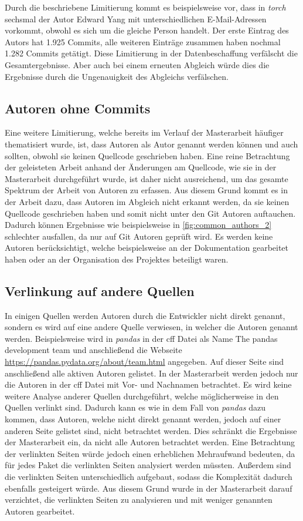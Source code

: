 Durch die beschriebene Limitierung kommt es beispielsweise vor, dass in \emph{torch} sechsmal der Autor \glqq Edward Yang\grqq{} mit unterschiedlichen E-Mail-Adressen vorkommt, obwohl es sich um die gleiche Person handelt.
Der erste Eintrag des Autors hat 1.925 Commits, alle weiteren Einträge zusammen haben nochmal 1.282 Commits getätigt.
Diese Limitierung in der Datenbeschaffung verfälscht die Gesamtergebnisse.
Aber auch bei einem erneuten Abgleich würde dies die Ergebnisse durch die Ungenauigkeit des Abgleichs verfälschen.

\subsection*{Autoren ohne Commits}
\label{sec:autoren_ohne_commits}
Eine weitere Limitierung, welche bereits im Verlauf der Masterarbeit häufiger thematisiert wurde, ist, dass Autoren als Autor genannt werden können und auch sollten, obwohl sie keinen Quellcode geschrieben haben.
Eine reine Betrachtung der geleisteten Arbeit anhand der Änderungen am Quellcode, wie sie in der Masterarbeit durchgeführt wurde, ist daher nicht ausreichend, um das gesamte Spektrum der Arbeit von Autoren zu erfassen.
Aus diesem Grund kommt es in der Arbeit dazu, dass Autoren im Abgleich nicht erkannt werden, da sie keinen Quellcode geschrieben haben und somit nicht unter den Git Autoren auftauchen.
Dadurch können Ergebnisse wie beispielsweise in \autoref{fig:common_authors_2} schlechter ausfallen, da nur auf Git Autoren geprüft wird.
Es werden keine Autoren berücksichtigt, welche beispielsweise an der Dokumentation gearbeitet haben oder an der Organisation des Projektes beteiligt waren.

\subsection*{Verlinkung auf andere Quellen}
\label{sec:verlinkung_auf_andere_quellen}
In einigen Quellen werden Autoren durch die Entwickler nicht direkt genannt, sondern es wird auf eine andere Quelle verwiesen, in welcher die Autoren genannt werden.
Beispielsweise wird in \emph{pandas} in der \gls{cff} Datei als Name \glqq The pandas development team\grqq{} und anschließend die Webseite \url{https://pandas.pydata.org/about/team.html} angegeben.
Auf dieser Seite sind anschließend alle aktiven Autoren gelistet.
In der Masterarbeit werden jedoch nur die Autoren in der \gls{cff} Datei mit Vor- und Nachnamen betrachtet.
Es wird keine weitere Analyse anderer Quellen durchgeführt, welche möglicherweise in den Quellen verlinkt sind.
Dadurch kann es wie in dem Fall von \emph{pandas} dazu kommen, dass Autoren, welche nicht direkt genannt werden, jedoch auf einer anderen Seite gelistet sind, nicht betrachtet werden.
Dies schränkt die Ergebnisse der Masterarbeit ein, da nicht alle Autoren betrachtet werden.
Eine Betrachtung der verlinkten Seiten würde jedoch einen erheblichen Mehraufwand bedeuten, da für jedes Paket die verlinkten Seiten analysiert werden müssten.
Außerdem sind die verlinkten Seiten unterschiedlich aufgebaut, sodass die Komplexität dadurch ebenfalls gesteigert würde.
Aus diesem Grund wurde in der Masterarbeit darauf verzichtet, die verlinkten Seiten zu analysieren und mit weniger genannten Autoren gearbeitet.

